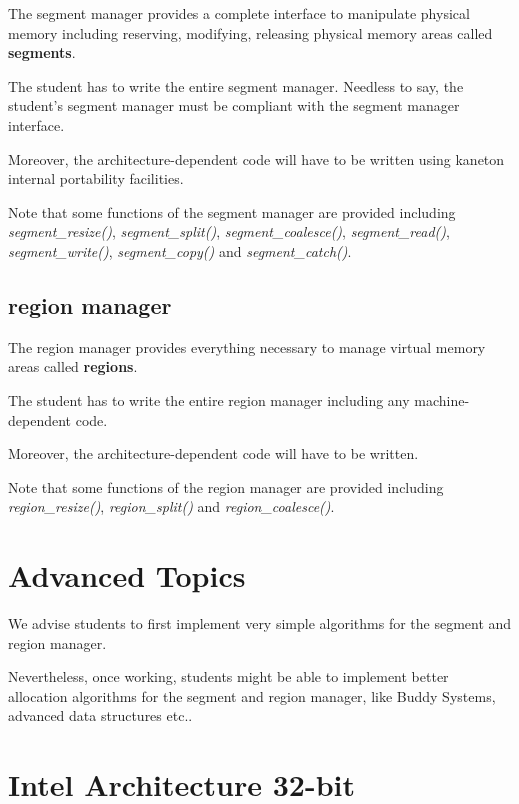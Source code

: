 The segment manager provides a complete interface to manipulate physical
memory including reserving, modifying, releasing physical memory areas
called \textbf{segments}.

The student has to write the entire segment manager. Needless to say, the
student's segment manager must be compliant with the segment manager
interface.

Moreover, the architecture-dependent code will have to be written using
kaneton internal portability facilities.

Note that some functions of the segment manager are provided including
\textit{segment\_resize()}, \textit{segment\_split()},
\textit{segment\_coalesce()}, \textit{segment\_read()},
\textit{segment\_write()}, \textit{segment\_copy()} and
\textit{segment\_catch()}.

%
%

\subsection{region manager}

The region manager provides everything necessary to manage virtual
memory areas called \textbf{regions}.

The student has to write the entire region manager including any
machine-dependent code.

Moreover, the architecture-dependent code will have to be written.

Note that some functions of the region manager are provided including
\textit{region\_resize()}, \textit{region\_split()} and
\textit{region\_coalesce()}.

%
%

\section{Advanced Topics}

We advise students to first implement very simple algorithms for the segment
and region manager.

Nevertheless, once working, students might be able to implement better
allocation algorithms for the segment and region manager, like Buddy Systems,
advanced data structures etc..

%
%

\section{Intel Architecture 32-bit}

